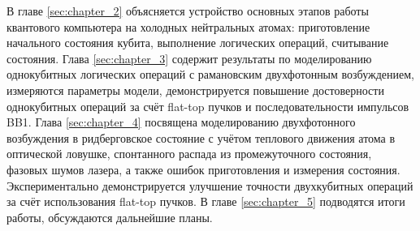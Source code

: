 В главе \ref{sec:chapter_2} объясняется устройство основных этапов работы квантового компьютера на холодных нейтральных атомах: приготовление начального состояния кубита, выполнение логических операций, считывание состояния. Глава \ref{sec:chapter_3} содержит результаты по моделированию однокубитных логических операций с рамановским двухфотонным возбуждением, измеряются параметры модели, демонстрируется повышение достоверности однокубитных операций за счёт flat-top пучков и последовательности импульсов BB1. Глава \ref{sec:chapter_4} посвящена моделированию двухфотонного возбуждения в ридберговское состояние с учётом теплового движения атома в оптической ловушке, спонтанного распада из промежуточного состояния, фазовых шумов лазера, а также ошибок приготовления и измерения состояния. Экспериментально демонстрируется улучшение точности двухкубитных операций за счёт использования flat-top пучков. В главе \ref{sec:chapter_5} подводятся итоги работы, обсуждаются дальнейшие планы.

\newpage